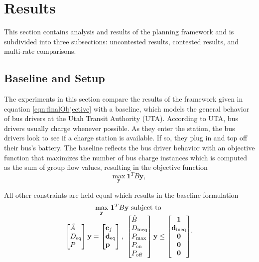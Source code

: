 \section{Results}
This section contains analysis and results of the planning framework and is subdivided into three subsections: uncontested results, contested results, and multi-rate comparisons.  
\subsection{\label{sec:setup} Baseline and Setup}
The experiments in this section compare the results of the framework given in equation \ref{eqn:finalObjective} with a baseline, which models the general behavior of bus drivers at the Utah Transit Authority (UTA). According to UTA, bus drivers usually charge whenever possible.  As they enter the station, the bus drivers look to see if a charge station is available. If so, they plug in and top off their bus's battery. The baseline reflects the bus driver behavior with an objective function that maximizes the number of bus charge instances which is computed as the sum of group flow values, resulting in the objective function
\begin{equation}
	\underset{\mathbf{y}}{\text{max}} \ \mathbf{1}^TB\mathbf{y},
\end{equation}
\par All other constraints are held equal which results in the baseline formulation 
\begin{equation}\label{eqn:finalBaselineObjective}
	\begin{matrix*}[c]
		\underset{\mathbf{y}}{\scalebox{1}{\text{max}}} \ \mathbf{1}^TB\mathbf{y} \ \text{subject to}\\
		\begin{bmatrix*}[l]
				\tilde{A} \\
				D_{\text{eq}} \\
				P
				\end{bmatrix*} \mathbf{y} = \begin{bmatrix*}[l]\mathbf{c}_f \\ \mathbf{d}_{\text{eq}}\\\mathbf{p} \end{bmatrix*}, \ \begin{bmatrix*}[l]
			\tilde{B} \\
			D_{\text{ineq}} \\ 
			P_{\text{max}} \\
			P_{\text{on}} \\
			P_{\text{off}}
			\end{bmatrix*}\mathbf{y} \le \begin{bmatrix*}\mathbf{1} \\ \mathbf{d}_{\text{ineq}} \\ \mathbf{0} \\ \mathbf{0} \\ \mathbf{0} \end{bmatrix*}
	\end{matrix*}.
\end{equation}
